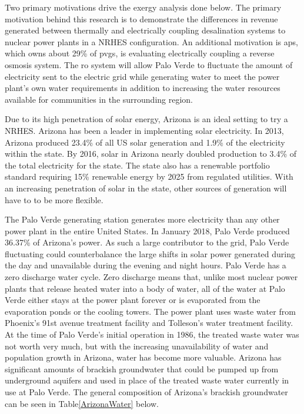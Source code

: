 
Two primary motivations drive the exergy analysis done below.  The primary motivation behind this research is to demonstrate the differences in revenue generated between thermally and electrically coupling desalination systems to nuclear power plants in a NRHES configuration.   An additional motivation is \ac{aps}, which owns about 29\% of \ac{pvgs}, is evaluating electrically coupling a reverse osmosis system.  The \ac{ro} system will allow Palo Verde to fluctuate the amount of electricity sent to the electric grid while generating water to meet the power plant's own water requirements in addition to increasing the water resources available for communities in the surrounding region.

Due to its high penetration of solar energy, Arizona is an ideal setting to try a NRHES. Arizona has been a leader in implementing solar electricity. In 2013, Arizona produced 23.4\% of all US solar generation and 1.9\% of the electricity within the state.  By 2016, solar in Arizona nearly doubled production to 3.4\% of the total electricity for the state. The state also has a renewable portfolio standard requiring 15\% renewable energy by 2025 from regulated utilities\cite{DSIRE2017}. With an increasing penetration of solar in the state, other sources of generation will have to to be more flexible.

The Palo Verde generating station generates more electricity than any other power plant in the entire United States. In January 2018, Palo Verde produced 36.37\% of Arizona's power\cite{eia2018}.  As such a large contributor to the grid, Palo Verde fluctuating could counterbalance the large shifts in solar power generated during the day and unavailable during the evening and night hours. Palo Verde has a zero discharge water cycle.  Zero discharge means that, unlike most nuclear power plants that release heated water into a body of water, all of the water at Palo Verde either stays at the power plant forever or is evaporated from the evaporation ponds or the cooling towers.  The power plant uses waste water from Phoenix's 91st avenue treatment facility and Tolleson's water treatment facility. At the time of Palo Verde's initial operation in 1986, the treated waste water was not worth very much, but with the increasing unavailability of water and population growth in Arizona, water has become more valuable\cite{Brown2018}.  Arizona has significant amounts of brackish groundwater that could be pumped up from underground aquifers and used in place of the treated waste water currently in use at Palo Verde. The general composition of Arizona's brackish groundwater can be seen in Table\ref{ArizonaWater} below.

